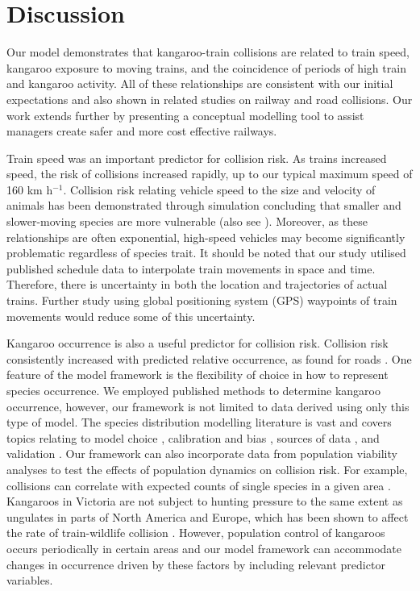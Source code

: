 \section{Discussion}

Our model demonstrates that kangaroo-train collisions are related to train speed, kangaroo exposure to moving trains, and the coincidence of periods of high train and kangaroo activity.  All of these relationships are consistent with our initial expectations and also shown in related studies on railway \citep{gund98} and road \citep{lao11,roge12} collisions. Our work extends further by presenting a conceptual modelling tool to assist managers create safer and more cost effective railways.

Train speed was an important predictor for collision risk.  As trains increased speed, the risk of collisions increased rapidly, up to our typical maximum speed of 160 km h$^{-1}$.  Collision risk relating vehicle speed to the size and velocity of animals has been demonstrated through simulation \citep{jaar06} concluding that smaller and slower-moving species are more vulnerable (also see \cite{fahr09}). Moreover, as these relationships are often exponential, high-speed vehicles may become significantly problematic regardless of species trait. It should be noted that our study utilised published schedule data to interpolate train movements in space and time. Therefore, there is uncertainty in both the location and trajectories of actual trains. Further study using global positioning system (GPS) waypoints of train movements would reduce some of this uncertainty.

Kangaroo occurrence is also a useful predictor for collision risk. Collision risk consistently increased with predicted relative occurrence, as found for roads \citep{lao11,roge09}.  One feature of the model framework is the flexibility of choice in how to represent species occurrence.  We employed published methods to determine kangaroo occurrence, however, our framework is not limited to data derived using only this type of model.  The species distribution modelling literature is vast and covers topics relating to model choice \citep{guil15}, calibration and bias \citep{phil10}, sources of data \citep{vans13}, and validation \citep{chiv14}.  Our framework can also incorporate data from population viability analyses to test the effects of population dynamics on collision risk. For example, collisions can correlate with expected counts of single species in a given area \citep{skor13}.  Kangaroos in Victoria are not subject to hunting pressure to the same extent as ungulates in parts of North America and Europe, which has been shown to affect the rate of train-wildlife collision \citep{seil05}.  However, population control of kangaroos occurs periodically in certain areas and our model framework can accommodate changes in occurrence driven by these factors by including relevant predictor variables. 

